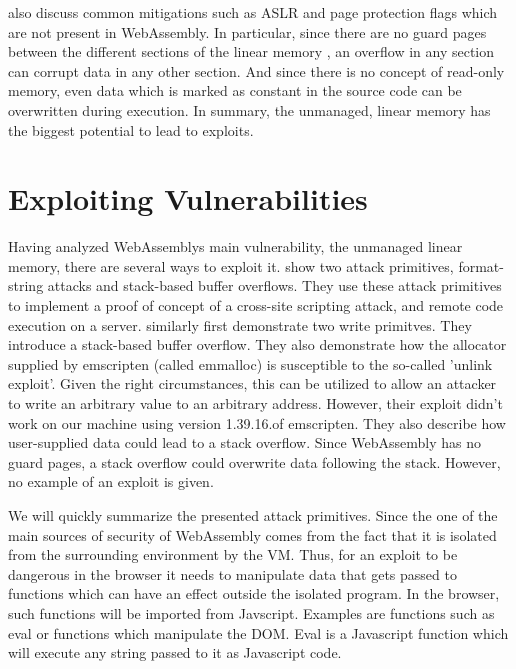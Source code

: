\documentclass[sigconf]{acmart}
\begin{document}
\cite{lehmann_everything_2020} also discuss common mitigations such as ASLR and page protection flags which are not present in WebAssembly. In particular, since there are no guard pages between the different sections of the linear memory , an overflow in any section can corrupt data in any other section. And since there is no concept of read-only memory, even data which is marked as constant in the source code can be overwritten during execution. In summary, the unmanaged, linear memory has the biggest potential to lead to exploits.

\section{Exploiting Vulnerabilities}
Having analyzed WebAssemblys main vulnerability, the unmanaged linear memory, there are several ways to exploit it. \cite{mcfadden_security_2018} show two attack primitives, format-string attacks and stack-based buffer overflows. They use these attack primitives to implement a proof of concept of a cross-site scripting attack, and remote code execution on a server.
\cite{lehmann_everything_2020} similarly first demonstrate two write primitves. They introduce a stack-based buffer overflow. They also demonstrate how the allocator supplied by emscripten (called emmalloc) is susceptible to the so-called 'unlink exploit'. Given the right circumstances, this can be utilized to allow an attacker to write an arbitrary value to an arbitrary address. However, their exploit didn't work on our machine using version 1.39.16.of emscripten. They also describe how user-supplied data could lead to a stack overflow. Since WebAssembly has no guard pages, a stack overflow could overwrite data following the stack. However, no example of an exploit is given. 

We will quickly summarize the presented attack primitives. Since the one of the main sources of security of WebAssembly comes from the fact that it is isolated from the surrounding environment by the VM. Thus, for an exploit to be dangerous in the browser it needs to manipulate data that gets passed to functions which can have an effect outside the isolated program. In the browser, such functions will be imported from Javscript. Examples are functions such as eval or functions which manipulate the DOM.
Eval is a Javascript function which will execute any string passed to it as Javascript code. 
\end{document}
